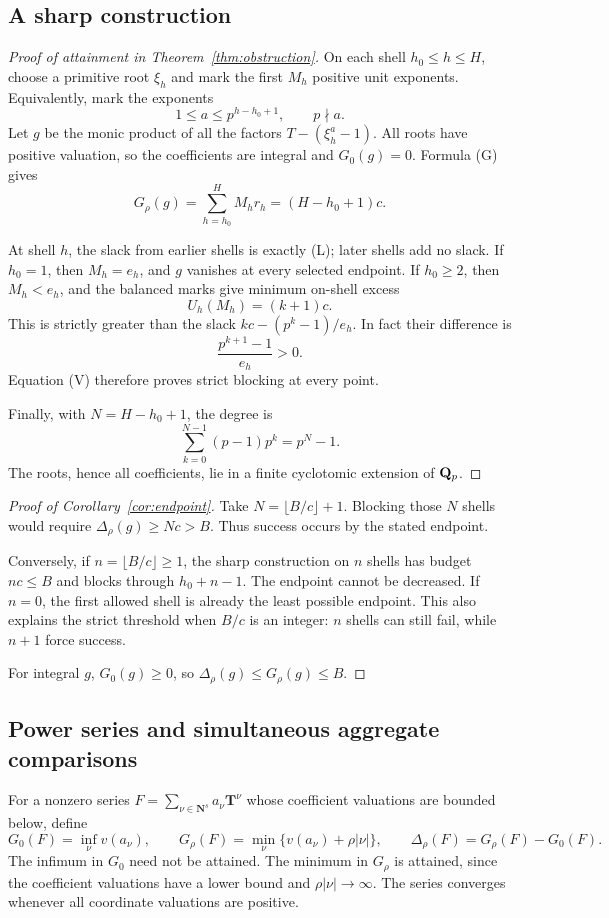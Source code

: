 \subsection{A sharp construction}
\begin{proof}[Proof of attainment in Theorem~\ref{thm:obstruction}]
On each shell \(h_0\le h\le H\), choose a primitive root \(\xi_h\) and mark the first \(M_h\) positive unit exponents. Equivalently, mark the exponents
\[
 1\le a\le p^{h-h_0+1},\qquad p\nmid a.
\]
Let \(g\) be the monic product of all the factors
\(T-(\xi_h^a-1)\).
All roots have positive valuation, so the coefficients are integral and \(G_0(g)=0\). Formula (G) gives
\[
 G_\rho(g)=\sum_{h=h_0}^H M_hr_h=(H-h_0+1)c.
\]

At shell \(h\), the slack from earlier shells is exactly (L); later shells add no slack. If \(h_0=1\), then \(M_h=e_h\), and \(g\) vanishes at every selected endpoint. If \(h_0\ge2\), then \(M_h<e_h\), and the balanced marks give minimum on-shell excess
\[
 U_h(M_h)=(k+1)c.
\]
This is strictly greater than the slack
\(kc-(p^k-1)/e_h\). In fact their difference is
\[
 \frac{p^{k+1}-1}{e_h}>0.
\]
Equation (V) therefore proves strict blocking at every point.

Finally, with \(N=H-h_0+1\), the degree is
\[
 \sum_{k=0}^{N-1}(p-1)p^k=p^N-1.
\]
The roots, hence all coefficients, lie in a finite cyclotomic extension of \(\mathbf Q_p\).
\end{proof}

\begin{proof}[Proof of Corollary~\ref{cor:endpoint}]
Take \(N=\lfloor B/c\rfloor+1\). Blocking those \(N\) shells would require
\(\Delta_\rho(g)\ge Nc>B\). Thus success occurs by the stated endpoint.

Conversely, if \(n=\lfloor B/c\rfloor\ge1\), the sharp construction on \(n\) shells has budget \(nc\le B\) and blocks through \(h_0+n-1\). The endpoint cannot be decreased. If \(n=0\), the first allowed shell is already the least possible endpoint. This also explains the strict threshold when \(B/c\) is an integer: \(n\) shells can still fail, while \(n+1\) force success.

For integral \(g\), \(G_0(g)\ge0\), so \(\Delta_\rho(g)\le G_\rho(g)\le B\).
\end{proof}

\subsection{Power series and simultaneous aggregate comparisons}
For a nonzero series
\(F=\sum_{\nu\in\mathbf N^s}a_\nu\mathbf T^\nu\)
whose coefficient valuations are bounded below, define
\[
 G_0(F)=\inf_\nu v(a_\nu),\qquad
 G_\rho(F)=\min_\nu\{v(a_\nu)+\rho|\nu|\},\qquad
 \Delta_\rho(F)=G_\rho(F)-G_0(F).
\]
The infimum in \(G_0\) need not be attained. The minimum in \(G_\rho\) is attained, since the coefficient valuations have a lower bound and \(\rho|\nu|\to\infty\).
The series converges whenever all coordinate valuations are positive.

